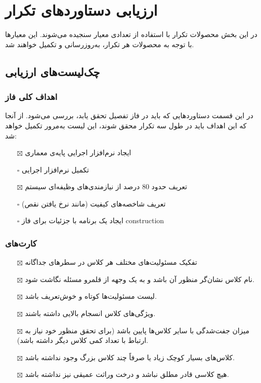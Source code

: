 \chapter{ارزیابی دستاوردهای تکرار}
در این بخش محصولات تکرار با استفاده از تعدادی معیار سنجیده می‌شوند. این معیارها با توجه به محصولات هر تکرار، به‌روزرسانی و تکمیل خواهند شد.
\section{چک‌لیست‌های ارزیابی}

\iffalse
Item icons for checklists:	
	\item[$\square$]
	\item[$\boxtimes$]
\fi

\subsection{اهداف کلی فاز}
در این قسمت دستاوردهایی که باید در فاز تفصیل تحقق یابد، بررسی می‌شود. از آنجا که این اهداف باید در طول سه تکرار محقق شوند، این لیست به‌مرور تکمیل خواهد شد:
\begin{itemize} %
	\item[$\boxtimes$]
	ایجاد نرم‌افزار اجرایی پایه‌ی معماری
	\item[$\square$]
	تکمیل نرم‌افزار اجرایی
	\item[$\boxtimes$]
	تعریف حدود 80 درصد از نیازمندی‌های وظیفه‌ای سیستم
	\item[$\square$]
	تعریف شاخصه‌های کیفیت (مانند نرخ یافتن نقص)
	\item[$\square$]
	ایجاد یک برنامه با جزئیات برای فاز construction
	
\end{itemize}

\subsection{کارت‌های }

\begin{itemize}
	\item[$\boxtimes$]
	تفکیک مسئولیت‌های مختلف هر کلاس در سطرهای جداگانه
	\item[$\boxtimes$]
	نام کلاس نشان‌گر منظور آن باشد و به یک وجهه از قلمرو مسئله نگاشت شود.
	\item[$\boxtimes$]
	لیست مسئولیت‌ها کوتاه و خوش‌تعریف باشد.
	\item[$\boxtimes$]
	ویژگی‌های کلاس انسجام بالایی داشته باشند.
	\item[$\boxtimes$]
	میزان جفت‌شدگی با سایر کلاس‌ها پایین باشد (برای تحقق منظور خود نیاز به ارتباط با تعداد کمی کلاس دیگر داشته باشد).
	\item[$\boxtimes$]
	کلاس‌های بسیار کوچک زیاد یا صرفاً چند کلاس بزرگ وجود نداشته باشد.
	\item[$\boxtimes$]
	هیچ کلاسی قادر مطلق نباشد و درخت وراثت عمیقی نیز نداشته باشد.

\end{itemize}

